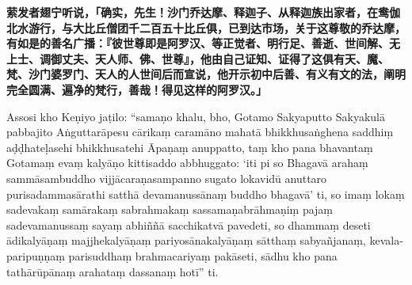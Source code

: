 \textbf{萦发者翅宁听说，「确实，先生！沙门乔达摩、释迦子、从释迦族出家者，在鸯伽北水游行，与大比丘僧团千二百五十比丘俱，已到达市场，关于这尊敬的乔达摩，有如是的善名广播：『彼世尊即是阿罗汉、等正觉者、明行足、善逝、世间解、无上士、调御丈夫、天人师、佛、世尊』，他由自己证知、证得了这俱有天、魔、梵、沙门婆罗门、天人的人世间后而宣说，他开示初中后善、有义有文的法，阐明完全圆满、遍净的梵行，善哉！得见这样的阿罗汉。」}

Assosi kho Keṇiyo jaṭilo: “samaṇo khalu, bho, Gotamo Sakyaputto Sakyakulā pabbajito Aṅguttarāpesu cārikaṃ caramāno mahatā bhikkhusaṅghena saddhiṃ aḍḍhateḷasehi bhikkhusatehi Āpaṇaṃ anuppatto, taṃ kho pana bhavantaṃ Gotamaṃ evaṃ kalyāṇo kittisaddo abbhuggato: ‘iti pi so Bhagavā arahaṃ sammāsambuddho vijjācaraṇasampanno sugato lokavidū anuttaro purisadammasārathi satthā devamanussānaṃ buddho bhagavā’ ti, so imaṃ lokaṃ sadevakaṃ samārakaṃ sabrahmakaṃ sassamaṇabrāhmaṇiṃ pajaṃ sadevamanussaṃ sayaṃ abhiññā sacchikatvā pavedeti, so dhammaṃ deseti ādikalyāṇaṃ majjhekalyāṇaṃ pariyosānakalyāṇaṃ sātthaṃ sabyañjanaṃ, kevala-paripuṇṇaṃ parisuddhaṃ brahmacariyaṃ pakāseti, sādhu kho pana tathārūpānaṃ arahataṃ dassanaṃ hotī” ti.

